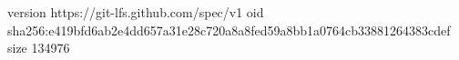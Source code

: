 version https://git-lfs.github.com/spec/v1
oid sha256:e419bfd6ab2e4dd657a31e28c720a8a8fed59a8bb1a0764cb33881264383cdef
size 134976
